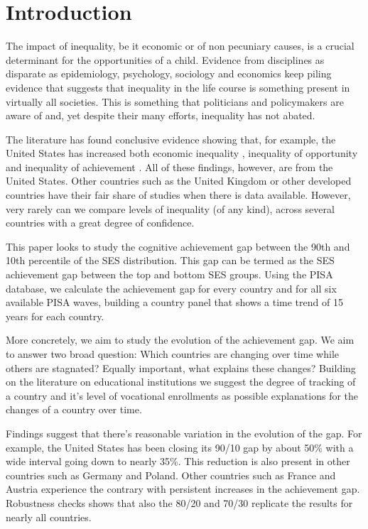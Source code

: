 \documentclass[11pt, a4paper]{article}\usepackage[]{graphicx}\usepackage[]{color}
\begin{document}


\section{Introduction}

The impact of inequality, be it economic or of non pecuniary causes, is a crucial determinant for the opportunities of a child. Evidence from disciplines as disparate as epidemiology, psychology, sociology and economics keep piling evidence that suggests that inequality in the life course is something present in virtually all societies. This is something that politicians and policymakers are aware of and, yet despite their many efforts, inequality has not abated.

The literature has found conclusive evidence showing that, for example, the United States has increased both economic inequality \citep{piketty2003}, inequality of opportunity \citep{chetty2014} and inequality of achievement \citep{reardon2011}. All of these findings, however, are from the United States. Other countries such as the United Kingdom or other developed countries have their fair share of studies when there is data available. However, very rarely can we compare levels of inequality (of any kind), across several countries with a great degree of confidence.

This paper looks to study the cognitive achievement gap between the 90th and 10th percentile of the SES distribution. This gap can be termed as the SES achievement gap between the top and bottom SES groups. Using the PISA database, we calculate the achievement gap for every country and for all six available PISA waves, building a country panel that shows a time trend of 15 years for each country.

More concretely, we aim to study the evolution of the achievement gap. We aim to answer two broad question: Which countries are changing over time while others are stagnated? Equally important, what explains these changes? Building on the literature on educational institutions we suggest the degree of tracking of a country and it's level of vocational enrollments as possible explanations for the changes of a country over time.

Findings suggest that there's reasonable variation in the evolution of the gap. For example, the United States has been closing its 90/10 gap by about 50\% with a wide interval going down to nearly 35\%. This reduction is also present in other countries such as Germany and Poland. Other countries such as France and Austria experience the contrary with persistent increases in the achievement gap. Robustness checks shows that also the 80/20 and 70/30 replicate the results for nearly all countries.
\end{document}
